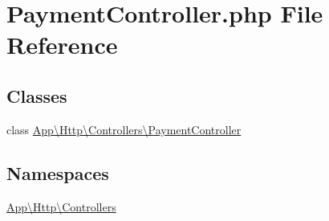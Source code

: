 \hypertarget{_payment_controller_8php}{}\section{Payment\+Controller.\+php File Reference}
\label{_payment_controller_8php}
\subsection*{Classes}
\begin{DoxyCompactItemize}
\item 
class \mbox{\hyperlink{class_app_1_1_http_1_1_controllers_1_1_payment_controller}{App\textbackslash{}\+Http\textbackslash{}\+Controllers\textbackslash{}\+Payment\+Controller}}
\end{DoxyCompactItemize}
\subsection*{Namespaces}
\begin{DoxyCompactItemize}
\item 
 \mbox{\hyperlink{namespace_app_1_1_http_1_1_controllers}{App\textbackslash{}\+Http\textbackslash{}\+Controllers}}
\end{DoxyCompactItemize}
